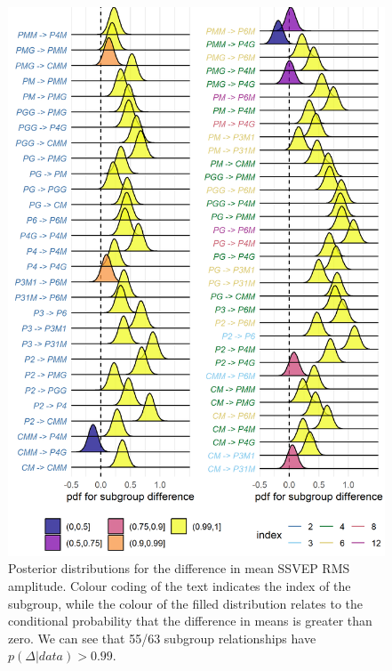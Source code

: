 \documentclass[9pt,twocolumn,twoside,lineno]{pnas-new}
\begin{document}
\begin{figure}[tbh]
\centering
\includegraphics[width=1\linewidth]{../analysis/plots/subgroup_comp_eeg_rms.png}
\caption{Posterior distributions for the difference in mean SSVEP RMS amplitude. Colour coding of the text indicates the index of the subgroup, while the colour of the filled distribution relates to the conditional probability that the difference in means is greater than zero. We can see that 55/63 subgroup relationships have $p(\Delta|data)>0.99$.}
\label{fig:eeg_comp}
\end{figure}
\end{document}
